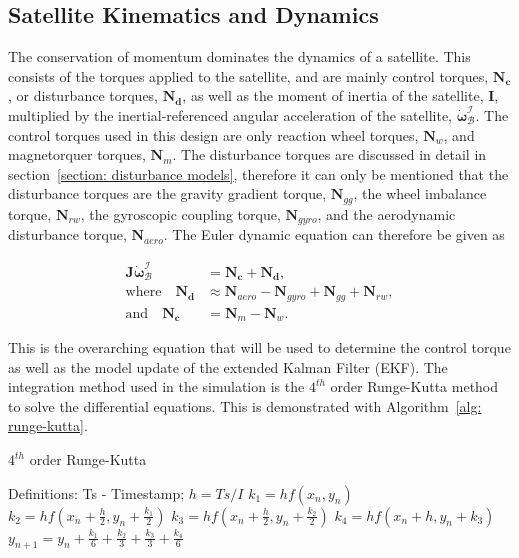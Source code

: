 \subsection{Satellite Kinematics and Dynamics}
The conservation of momentum dominates the dynamics of a satellite. This consists of the torques applied to the satellite, and are mainly control torques, $\mathbf{N_c}$, or disturbance torques, $\mathbf{N_d}$, as well as the moment of inertia of the satellite, $\mathbf{I}$, multiplied by the inertial-referenced angular acceleration of the satellite, $\boldsymbol{\dot{\omega}}_{\mathcal{B}}^{\mathcal{I}}$. The control torques used in this design are only reaction wheel torques, $\mathbf{N}_w$, and magnetorquer torques, $\mathbf{N}_m$. The disturbance torques are discussed in detail in section~\ref{section: disturbance models}, therefore it can only be mentioned that the disturbance torques are the gravity gradient torque, $\mathbf{N}_{gg}$, the wheel imbalance torque, $\mathbf{N}_{rw}$, the gyroscopic coupling torque, $\mathbf{N}_{gyro}$, and the aerodynamic disturbance torque, $\mathbf{N}_{aero}$. The Euler dynamic equation can therefore be given as

\begin{equation}
\begin{aligned}
	\mathbf{J}\boldsymbol{\dot{\omega}}_{\mathcal{B}}^{\mathcal{I}} &= \mathbf{N_c} + \mathbf{N_d}, \\
	\text{where} \quad \mathbf{N_d} &\approx \mathbf{N}_{aero} - \mathbf{N}_{gyro} + \mathbf{N}_{gg} + \mathbf{N}_{rw}, \\
	\text{and} \quad \mathbf{N_c} &= \mathbf{N}_{m} - \mathbf{N}_{w}.
\end{aligned}
\label{Eq-EulerDynamic}
\end{equation}

This is the overarching equation that will be used to determine the control torque as well as the model update of the extended Kalman Filter (EKF). The integration method used in the simulation is the $4^{th}$ order Runge-Kutta method to solve the differential equations. This is demonstrated with Algorithm~\ref{alg: runge-kutta}.

\begin{algorithm}[!htb]
	\caption[$4^{th}$ order Runge-Kutta]{$4^{th}$ order Runge-Kutta}
	\label{alg: runge-kutta}
	\begin{algorithmic}[1]
		\State Definitions: Ts - Timestamp; 
		\State $h = Ts/I$ 
		\State	$k_1 = hf(x_n, y_n)$
		\State	$k_2 = hf(x_n + \frac{h}{2}, y_n + \frac{k_1}{2})$
		\State	$k_3 = hf(x_n + \frac{h}{2}, y_n + \frac{k_2}{2})$
		\State	$k_4 = hf(x_n + h, y_n + k_3)$
		\State	$y_{n+1}=y_n + \frac{k_1}{6} + \frac{k_2}{3} + \frac{k_3}{3} + \frac{k_4}{6}$
		\EndFor

	\end{algorithmic}
\end{algorithm}

